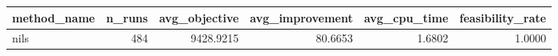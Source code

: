 \begin{tabular}{lrrrrr}
\toprule
method_name & n_runs & avg_objective & avg_improvement & avg_cpu_time & feasibility_rate \\
\midrule
nils & 484 & 9428.9215 & 80.6653 & 1.6802 & 1.0000 \\
\bottomrule
\end{tabular}
